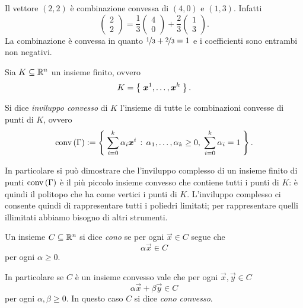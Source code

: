 \begin{example}
    Il vettore $(2, 2)$ è combinazione convessa di $(4, 0)$ e $(1, 3)$. Infatti \[
        \begin{pmatrix} 2 \\ 2 \end{pmatrix} = \frac{1}{3}\begin{pmatrix} 4 \\ 0 \end{pmatrix} + \frac{2}{3}\begin{pmatrix} 1 \\ 3 \end{pmatrix}.
    \] La combinazione è convessa in quanto $\nicefrac{1}{3} + \nicefrac{2}{3} = 1$ e i coefficienti sono entrambi non negativi.
\end{example}

\begin{definition}
    Sia $K \subseteq \mathbb{R}^n$ un insieme finito, ovvero \[
        K = \left\{\;\bm{x}^1, \dots, \bm{x}^k\;\right\}.
    \] 
    
    Si dice \emph{inviluppo convesso} di $K$ l'insieme di tutte le combinazioni convesse di punti di $K$, ovvero \begin{equation}
        \conv{K} \deq \set{\sum_{i = 0}^k \alpha_i\vec x^i \suchthat \alpha_1, \dots, \alpha_k \geq 0,\; \sum_{i=0}^k \alpha_i = 1}.
    \end{equation}
\end{definition}

In particolare si può dimostrare che l'inviluppo complesso di un insieme finito di punti $\conv{K}$ è il più piccolo insieme convesso che contiene tutti i punti di $K$: è quindi il politopo che ha come vertici i punti di $K$. L'inviluppo complesso ci consente quindi di rappresentare tutti i poliedri limitati; per rappresentare quelli illimitati abbiamo bisogno di altri strumenti.

\begin{definition}
     Un insieme $C \subseteq \mathbb{R}^n$ si dice \emph{cono} se per ogni $\vec x \in C$ segue che \begin{equation}
        \alpha\vec x \in C
    \end{equation} per ogni $\alpha \geq 0$.

    In particolare se $C$ è un insieme convesso vale che per ogni $\vec x, \vec y \in C$ \[
        \alpha\vec x + \beta\vec y \in C    
    \] per ogni $\alpha, \beta \geq 0$. In questo caso $C$ si dice \emph{cono convesso}.
\end{definition}

